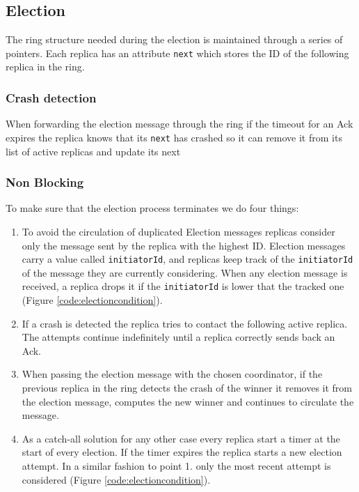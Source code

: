 \documentclass[a4paper]{article}
\begin{document}
        \subsection{Election}
            The ring structure needed during the election is maintained through a series of pointers. Each replica has an attribute \texttt{next} which stores the ID of the following replica in the ring.
            \subsubsection{Crash detection}
                When forwarding the election message through the ring if the timeout for an Ack expires the replica knows that its \texttt{next} has crashed so it can remove it from its list of active replicas and update its next
            \subsubsection{Non Blocking}
                To make sure that the election process terminates we do four things:
                \begin{enumerate}
                    \item To avoid the circulation of duplicated Election messages replicas consider only the message sent by the replica with the highest ID. Election messages carry a value called \texttt{initiatorId}, and replicas keep track of the \texttt{initiatorId} of the message they are currently considering. When any election message is received, a replica drops it if the \texttt{initiatorId} is lower that the tracked one (Figure \ref{code:electioncondition}).
                    \item If a crash is detected the replica tries to contact the following active replica. The attempts continue indefinitely until a replica correctly sends back an Ack.
                    \item When passing the election message with the chosen coordinator, if the previous replica in the ring detects the crash of the winner it removes it from the election message, computes the new winner and continues to circulate the message.
                    \item As a catch-all solution for any other case every replica start a timer at the start of every election. If the timer expires the replica starts a new election attempt. In a similar fashion to point 1. only the most recent attempt is considered (Figure \ref{code:electioncondition}).
                \end{enumerate}
\end{document}
